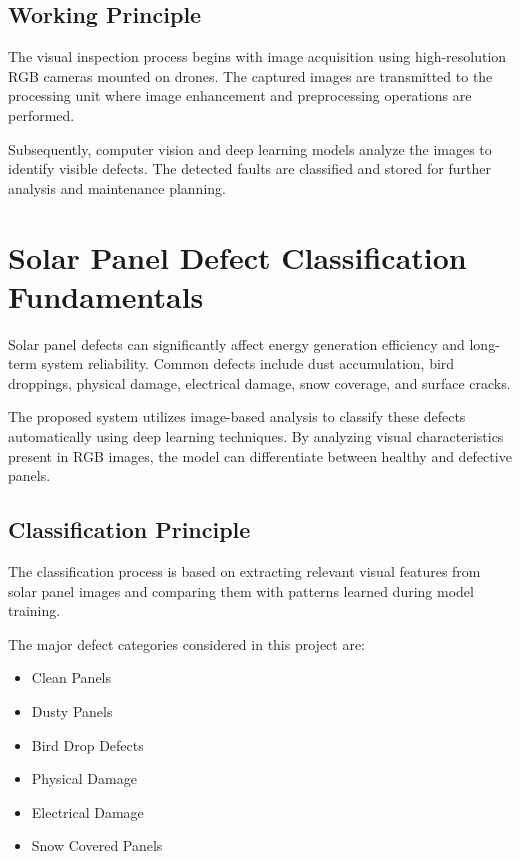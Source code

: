 \subsection{Working Principle}

The visual inspection process begins with image acquisition using high-resolution RGB cameras mounted on drones. The captured images are transmitted to the processing unit where image enhancement and preprocessing operations are performed.

Subsequently, computer vision and deep learning models analyze the images to identify visible defects. The detected faults are classified and stored for further analysis and maintenance planning.

\section{Solar Panel Defect Classification Fundamentals}

Solar panel defects can significantly affect energy generation efficiency and long-term system reliability. Common defects include dust accumulation, bird droppings, physical damage, electrical damage, snow coverage, and surface cracks.

The proposed system utilizes image-based analysis to classify these defects automatically using deep learning techniques. By analyzing visual characteristics present in RGB images, the model can differentiate between healthy and defective panels.

\subsection{Classification Principle}

The classification process is based on extracting relevant visual features from solar panel images and comparing them with patterns learned during model training.

The major defect categories considered in this project are:

\begin{itemize}
\item Clean Panels
\item Dusty Panels
\item Bird Drop Defects
\item Physical Damage
\item Electrical Damage
\item Snow Covered Panels
\end{itemize}

